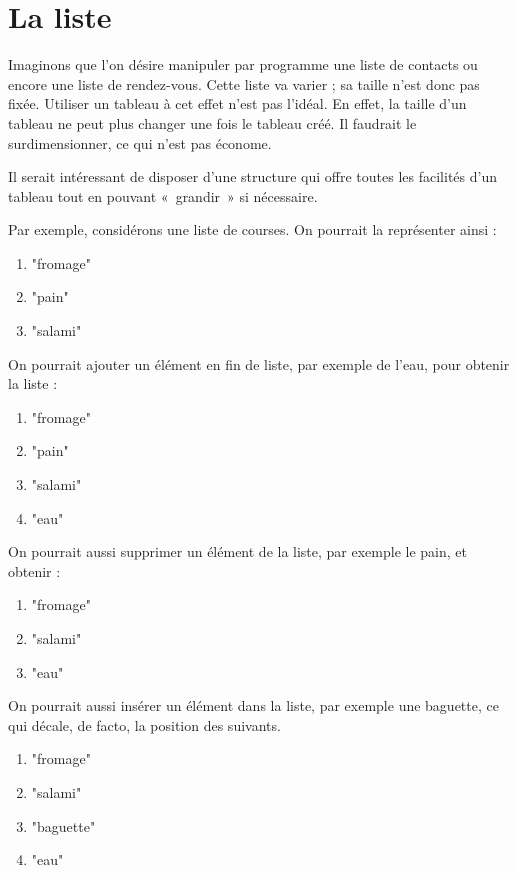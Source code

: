 \chapter{La liste}

Imaginons que l’on désire manipuler par programme une liste de contacts ou
encore une liste de rendez-vous. Cette liste va varier ; sa taille
n’est donc pas fixée. Utiliser un tableau à cet effet n’est pas l’idéal.
En effet, la taille d’un tableau ne peut plus changer une fois le tableau créé.
Il faudrait le surdimensionner, ce qui n’est pas économe.

Il serait intéressant de disposer d’une structure qui offre toutes les
facilités d’un tableau tout en pouvant «~grandir~» si nécessaire.

Par exemple, considérons une liste de courses.
On pourrait la représenter ainsi :
\begin{enumerate}
	\item "fromage"
	\item "pain"
	\item "salami"
\end{enumerate}

On pourrait ajouter un élément en fin de liste, par exemple de l'eau,
pour obtenir la liste :

\begin{enumerate}
	\item "fromage"
	\item "pain"
	\item "salami"
	\item "eau"
\end{enumerate}

On pourrait aussi supprimer un élément de la liste, par exemple le pain,
et obtenir :

\begin{enumerate}
	\item "fromage"
	\item "salami"
	\item "eau"
\end{enumerate}

On pourrait aussi insérer un élément dans la liste,
par exemple une baguette,
ce qui décale, de facto, la position des suivants.

\begin{enumerate}
	\item "fromage"
	\item "salami"
	\item "baguette"
	\item "eau"
\end{enumerate}

